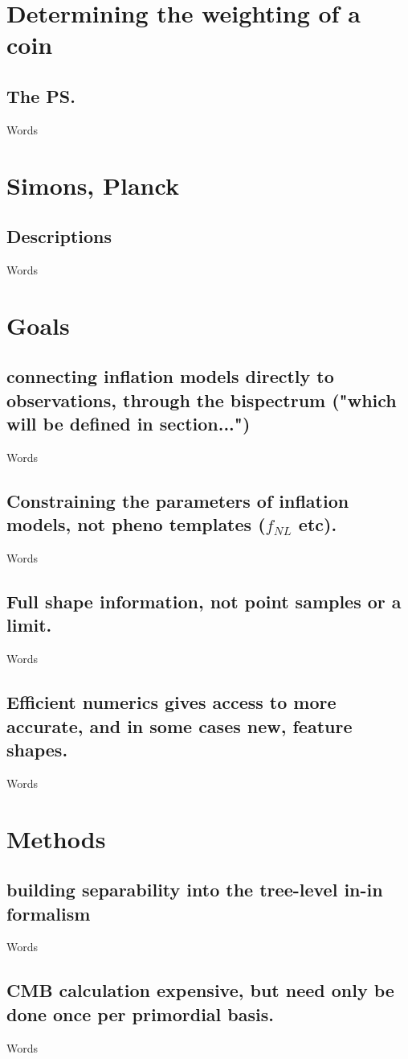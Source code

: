\section{Determining the weighting of a coin}
    \subsection{The PS.}
    Words
\section{Simons, Planck}
    \subsection{Descriptions}
    Words
\section{Goals}
    \subsection{connecting inflation models directly to observations, through the bispectrum ("which will be defined in section...")}
    Words
    \subsection{Constraining the parameters of inflation models, not pheno templates ($f_{NL}$ etc).}
    Words
    \subsection{Full shape information, not point samples or a limit.}
    Words
    \subsection{Efficient numerics gives access to more accurate, and in some cases new, feature shapes.}
    Words
\section{Methods}
    \subsection{building separability into the tree-level in-in formalism}
    Words
    \subsection{CMB calculation expensive, but need only be done once per primordial basis.}
    Words
